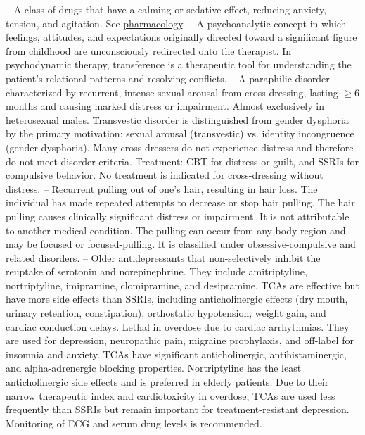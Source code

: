 -- A class of drugs that have a calming or sedative effect, reducing anxiety, tension, and agitation. See \hyperlink{Pharmacology}{pharmacology}.
-- A psychoanalytic concept in which feelings, attitudes, and expectations originally directed toward a significant figure from childhood are unconsciously redirected onto the therapist. In psychodynamic therapy, transference is a therapeutic tool for understanding the patient's relational patterns and resolving conflicts.
-- A paraphilic disorder characterized by recurrent, intense sexual arousal from cross-dressing, lasting \(\ge\)6 months and causing marked distress or impairment. Almost exclusively in heterosexual males. Transvestic disorder is distinguished from gender dysphoria by the primary motivation: sexual arousal (transvestic) vs. identity incongruence (gender dysphoria). Many cross-dressers do not experience distress and therefore do not meet disorder criteria. Treatment: CBT for distress or guilt, and SSRIs for compulsive behavior. No treatment is indicated for cross-dressing without distress.
-- Recurrent pulling out of one's hair, resulting in hair loss. The individual has made repeated attempts to decrease or stop hair pulling. The hair pulling causes clinically significant distress or impairment. It is not attributable to another medical condition. The pulling can occur from any body region and may be focused or focused-pulling. It is classified under obsessive-compulsive and related disorders.
-- Older antidepressants that non-selectively inhibit the reuptake of serotonin and norepinephrine. They include amitriptyline, nortriptyline, imipramine, clomipramine, and desipramine. TCAs are effective but have more side effects than SSRIs, including anticholinergic effects (dry mouth, urinary retention, constipation), orthostatic hypotension, weight gain, and cardiac conduction delays. Lethal in overdose due to cardiac arrhythmias. They are used for depression, neuropathic pain, migraine prophylaxis, and off-label for insomnia and anxiety. TCAs have significant anticholinergic, antihistaminergic, and alpha-adrenergic blocking properties. Nortriptyline has the least anticholinergic side effects and is preferred in elderly patients. Due to their narrow therapeutic index and cardiotoxicity in overdose, TCAs are used less frequently than SSRIs but remain important for treatment-resistant depression. Monitoring of ECG and serum drug levels is recommended.

